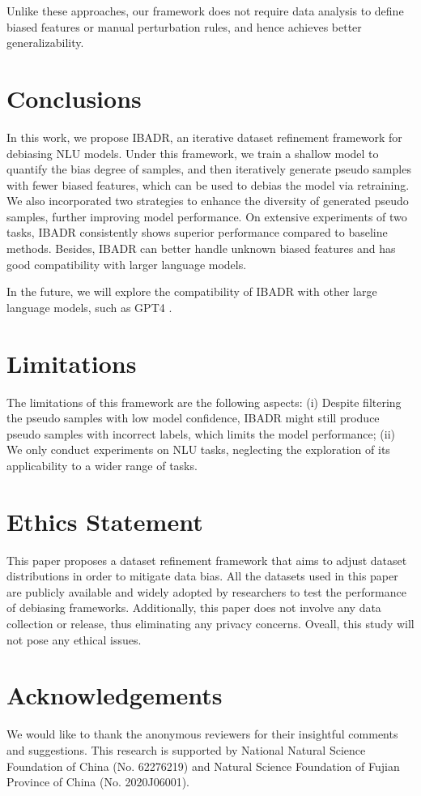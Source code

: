 \documentclass[11pt]{article}
\def\model{\textsc{IBADR}\xspace}
\begin{document}
Unlike these approaches, our framework does not require data analysis to define biased features or manual perturbation rules, and hence achieves better generalizability.



\section{Conclusions}

In this work, we propose \model, an iterative dataset refinement framework for debiasing NLU models. Under this framework, we train a shallow model to quantify the bias degree of samples, and then iteratively generate pseudo samples with fewer biased features, which can be used to debias the model via retraining. We also incorporated two strategies to enhance the diversity of generated pseudo samples, further improving model performance.
On extensive experiments of two tasks, \model consistently shows superior performance compared to baseline methods. Besides, \model can better handle unknown biased features and has good compatibility with larger language models. 

In the future,
we will explore the compatibility of IBADR with other large language models, such as GPT4 \cite{DBLP:journals/corr/abs-2303-08774}.
\section*{Limitations}
The limitations of this framework are the following aspects: (i) Despite filtering the pseudo samples with low model confidence, \model might still produce pseudo samples with incorrect labels, which limits the model performance; (ii) We only conduct experiments on NLU tasks, neglecting the exploration of its applicability to a wider range of tasks.

\section*{Ethics Statement}
This paper proposes a dataset refinement framework that aims to adjust dataset distributions in order to mitigate data bias. 
All the datasets used in this paper are publicly available and widely adopted by researchers to test the performance of debiasing frameworks. Additionally, this paper does not involve any data collection or release, thus eliminating any privacy concerns. Oveall, this study will not pose any ethical issues.

\section*{Acknowledgements}
We would like to thank the anonymous reviewers for their insightful comments and suggestions. This research is supported by National Natural Science Foundation of China (No. 62276219) and Natural Science Foundation of Fujian Province of China (No. 2020J06001).




\appendix
\end{document}
